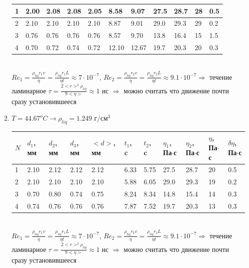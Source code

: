 \documentclass[12 pt, a4paper]{article}%
\begin{document}
\begin{enumerate}
\begin{table}[h!]
\begin{center}
\begin{tabular}{|*{11}{l|}}
     1 & 2.00 & 2.08 & 2.08 & 2.05 & 8.58 & 9.07 & 27.5 & 28.7 & 28 & 0.5 \\ \hline
     2 & 2.10 & 2.10 & 2.10 & 2.10 & 8.87 & 9.01 & 29.0 & 29.3 & 29 & 0.2\\ \hline
     3 & 0.76 & 0.76 & 0.76 & 0.76 & 8.57 & 9.70 & 13.8 & 16.4 & 15 & 1.5\\
     \hline
     4 & 0.70 & 0.72 & 0.74 & 0.72 & 12.10 & 12.67 & 19.7 & 20.3 & 20 & 0.3\\
     \hline
    \end{tabular}
   \end{center}
  \end{table} \\
  $Re_1 = \frac{\rho_{liq} r_1 v}{\eta} = \frac{\rho_{liq} r_1 L}{\eta t} \approx 7\cdot10^{-7} $,
  $Re_2 = \frac{\rho_{liq} r_2 v}{\eta} = \frac{\rho_{liq} r_2 L}{\eta t} \approx 9.1\cdot10^{-7} \Rightarrow$ течение ламинарное
  $\tau = \frac{2 <r>^2 \rho_{liq}}{9 <\eta>} \approx 1$ нс $\Rightarrow$ можно считать что движение почти сразу установившееся
  \item $T = 44.67 ^oC \rightarrow \rho_{liq} = 1.249$ г/см$^3$
    \begin{table}[h!] 
   \begin{center}
    \begin{tabular}{|*{11}{l|}} \hline
     $N$ & $d_1$, мм  & $d_2$, мм & $d_3$, мм & $<d>$, мм & $t_1$, c & $t_2$, c & $\eta_1$, Па$\cdot$с & $\eta_2$, Па$\cdot$с & $\eta$, Па$\cdot$с & $\delta\eta$, Па$\cdot$с \\ \hline
     1 & 2.10 & 2.12 & 2.12 & 2.12 & 6.33 & 5.75 & 27.5 & 28.7 & 20 & 0.5 \\ \hline
     2 & 2.10 & 2.10 & 2.10 & 2.10 & 5.88 & 6.05 & 29.0 & 29.3 & 19 & 0.2\\ \hline
     3 & 0.70 & 0.80 & 0.74 & 0.75 & 8.24 & 8.34 & 14.8 & 15.4 & 14 & 0.3\\
     \hline
     4 & 0.74 & 0.76 & 0.76 & 0.76 & 7.87 & 7.52 & 19.7 & 20.3 & 13 & 0.3\\
     \hline
    \end{tabular}
   \end{center}
  \end{table} \\
  $Re_1 = \frac{\rho_{liq} r_1 v}{\eta} = \frac{\rho_{liq} r_1 L}{\eta t} \approx 7\cdot10^{-7} $,
  $Re_2 = \frac{\rho_{liq} r_2 v}{\eta} = \frac{\rho_{liq} r_2 L}{\eta t} \approx 9.1\cdot10^{-7} \Rightarrow$ течение ламинарное
  $\tau = \frac{2 <r>^2 \rho_{liq}}{9 <\eta>} \approx 1$ нс $\Rightarrow$ можно считать что движение почти сразу установившееся
\end{enumerate}
\end{document}
